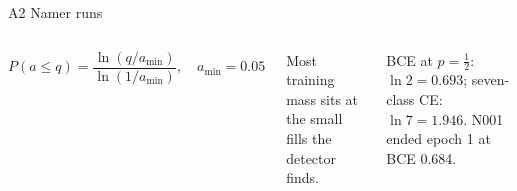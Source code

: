 \documentclass[aspectratio=169,10pt]{beamer}
\begin{document}
\begin{frame}{A2 Namer runs}
\begin{columns}[T,onlytextwidth]
\vspace{1.5mm}
\par\vspace{-1.5mm}
{\footnotesize\[P(a\le q)=\frac{\ln(q/a_{\min})}{\ln(1/a_{\min})},\quad a_{\min}=0.05\]\par}
\vspace{-1mm}
{\scriptsize Most training mass sits at the small fills the detector finds.\par}
\vspace{1.5mm}
\par
{\scriptsize BCE at $p=\frac12$: $\ln 2=0.693$; seven-class CE: $\ln 7=1.946$. N001 ended epoch 1 at BCE 0.684.\par}
\end{columns}
\end{frame}
\end{document}
